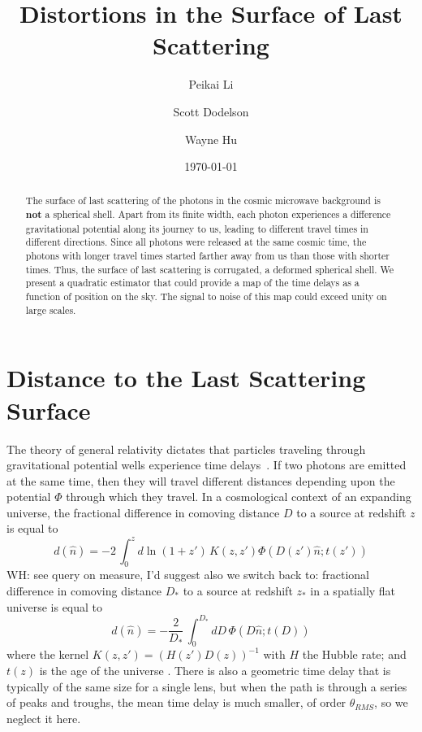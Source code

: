 \documentclass[prl,amsmath,amssymb,floatfix,superscriptaddress,nofootinbib,twocolumn]{revtex4-1}
\def\be{\begin{equation}}
\def\ee{\end{equation}}
\newcommand{\wh}[1]{{\color{red} WH: #1}}
\begin{document}
\title{Distortions in the Surface of Last Scattering}


\author{\large Peikai Li}
\author{\large Scott Dodelson}
\author{\large Wayne Hu}

\date{\today}

\begin{abstract}
The surface of last scattering of the photons in the cosmic microwave background is {\bf not} a spherical shell. Apart from its finite width, each photon experiences a difference gravitational potential along its journey to us, leading to different travel times in different directions. Since all photons were released at the same cosmic time, the photons with longer travel times started farther away from us than those with shorter times. Thus, the surface of last scattering is corrugated, a deformed spherical shell. We present a quadratic estimator that could provide a map of the time delays as a function of position on the sky. The signal to noise of this map could exceed unity on large scales.
\end{abstract}

\maketitle

\section{Distance to the Last Scattering Surface}
\newcommand\fd{d}

The theory of general relativity dictates that particles traveling through gravitational potential wells experience time delays~\cite{1964PhRvL..13..789S}. If two photons are emitted at the same time, then they will travel different distances depending upon the potential $\Phi$ through which they travel. In a cosmological context of an expanding universe, the fractional difference in comoving distance $D$ to a source at redshift $z$ is equal to  
\be
d(\hat n) = -2\, \int_0^{z} d\ln(1+z')\, K(z,z')\Phi\left(D(z')\hat n; t(z')\right)
\ee
\wh{see query on measure, I'd suggest also we switch back to: fractional difference in comoving distance
$D_*$ to a source at redshift $z_*$ in a spatially flat universe is equal to
\be
d(\hat n) = -\frac{2}{D_*}\, \int_0^{D_*} dD\, \Phi\left(D \hat n; t(D)\right)
\ee
}
where the kernel $K(z,z')=(H(z') D(z))^{-1}$ with $H$ the Hubble rate; and $t(z)$ is the age of the universe . There is also a geometric time delay that is typically of the same size for a single lens, but when the path is through a series of peaks and troughs, the mean time delay is much smaller, of order $\theta_{RMS}$, so we neglect it here. 
\end{document}
